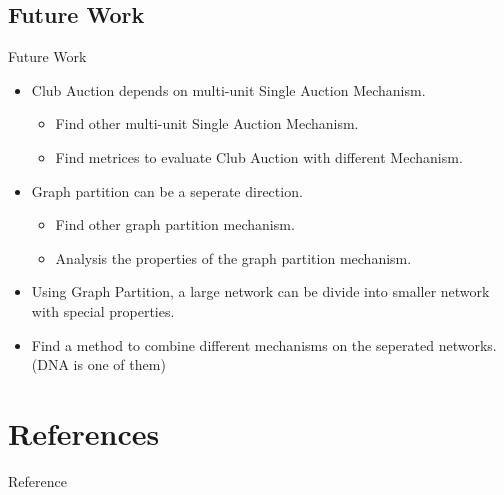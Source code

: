 \documentclass{beamer}
\begin{document}
\subsection{Future Work}
\begin{frame}{Future Work}
	\begin{itemize}

		\item Club Auction depends on multi-unit Single Auction Mechanism.
		      \begin{itemize}
			      \item Find other multi-unit Single Auction Mechanism.
			      \item Find metrices to evaluate Club Auction with different Mechanism.
		      \end{itemize}
		\item Graph partition can be a seperate direction.
		      \begin{itemize}
			      \item Find other graph partition mechanism.
			      \item Analysis the properties of the graph partition mechanism.
		      \end{itemize}
		\item Using Graph Partition, a large network can be divide into smaller network with special properties.
		\item Find a method to combine different mechanisms on the seperated networks. (DNA is one of them)
	\end{itemize}



\end{frame}

\section{References}
\begin{frame}{Reference}
	\nocite{*}
	\renewcommand*{\bibfont}{\tiny}
	\printbibliography
\end{frame}
\end{document}
